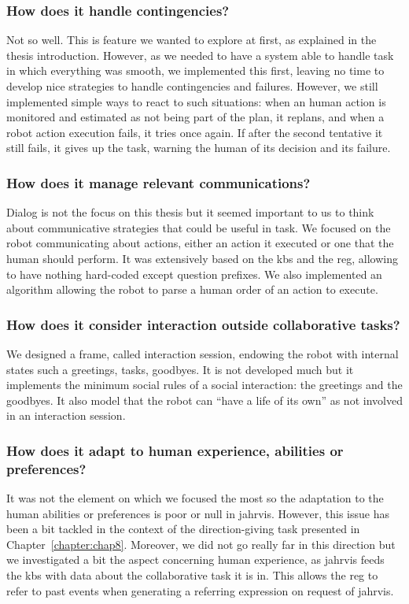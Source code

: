 \documentclass[a4paper,11pt,twoside]{StyleThese}
\begin{document}
\subsubsection*{How does it handle contingencies?} Not so well. This is feature we wanted to explore at first, as explained in the thesis introduction. However, as we needed to have a system able to handle task in which everything was smooth, we implemented this first, leaving no time to develop nice strategies to handle contingencies and failures. However, we still implemented simple ways to react to such situations: when an human action is monitored and estimated as not being part of the plan, it replans, and when a robot action execution fails, it tries once again. If after the second tentative it still fails, it gives up the task, warning the human of its decision and its failure.

\subsubsection*{How does it manage relevant communications?} Dialog is not the focus on this thesis but it seemed important to us to think about communicative strategies that could be useful in task. We focused on the robot communicating about actions, either an action it executed or one that the human should perform. It was extensively based on the \acrshort{kb}s and the \acrfull{reg}, allowing to have nothing hard-coded except question prefixes. We also implemented an algorithm allowing the robot to parse a human order of an action to execute.

\subsubsection*{How does it consider interaction outside collaborative tasks?} We designed a frame, called interaction session, endowing the robot with internal states such a greetings, tasks, goodbyes. It is not developed much but it implements the minimum social rules of a social interaction: the greetings and the goodbyes. It also model that the robot can ``have a life of its own'' as not involved in an interaction session.

\subsubsection*{How does it adapt to human experience, abilities or preferences?} It was not the element on which we focused the most so the adaptation to the human abilities or preferences is poor or null in \acrshort{jahrvis}. However, this issue has been a bit tackled in the context of the direction-giving task presented in Chapter~\ref{chapter:chap8}. Moreover, we did not go really far in this direction but we investigated a bit the aspect concerning human experience, as \acrshort{jahrvis} feeds the \acrshort{kb}s with data about the collaborative task it is in. This allows the \acrshort{reg} to refer to past events when generating a referring expression on request of \acrshort{jahrvis}.



\ifdefined{}
\else


\end{document}
